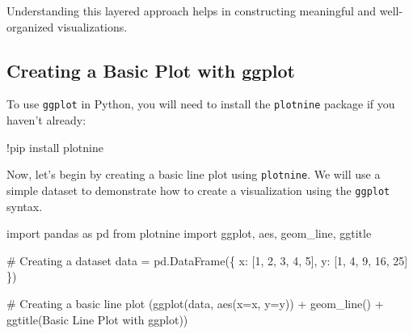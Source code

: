 \documentclass[
  letterpaper,
  DIV=11,
  numbers=noendperiod]{scrreprt}
\newenvironment{Shaded}{\begin{snugshade}}{\end{snugshade}}
\newcommand{\CommentTok}[1]{\textcolor[rgb]{0.37,0.37,0.37}{#1}}
\newcommand{\DecValTok}[1]{\textcolor[rgb]{0.68,0.00,0.00}{#1}}
\newcommand{\ImportTok}[1]{\textcolor[rgb]{0.00,0.46,0.62}{#1}}
\newcommand{\NormalTok}[1]{\textcolor[rgb]{0.00,0.23,0.31}{#1}}
\newcommand{\OperatorTok}[1]{\textcolor[rgb]{0.37,0.37,0.37}{#1}}
\newcommand{\StringTok}[1]{\textcolor[rgb]{0.13,0.47,0.30}{#1}}
\begin{document}
Understanding this layered approach helps in constructing meaningful and
well-organized visualizations.

\hypertarget{creating-a-basic-plot-with-ggplot}{%
\subsection{Creating a Basic Plot with
ggplot}\label{creating-a-basic-plot-with-ggplot}}

To use \texttt{ggplot} in Python, you will need to install the
\texttt{plotnine} package if you haven't already:

\begin{Shaded}
\begin{Highlighting}[]
\OperatorTok{!}\NormalTok{pip install plotnine}
\end{Highlighting}
\end{Shaded}

Now, let's begin by creating a basic line plot using \texttt{plotnine}.
We will use a simple dataset to demonstrate how to create a
visualization using the \texttt{ggplot} syntax.

\begin{Shaded}
\begin{Highlighting}[]
\ImportTok{import}\NormalTok{ pandas }\ImportTok{as}\NormalTok{ pd}
\ImportTok{from}\NormalTok{ plotnine }\ImportTok{import}\NormalTok{ ggplot, aes, geom\_line, ggtitle}

\CommentTok{\# Creating a dataset}
\NormalTok{data }\OperatorTok{=}\NormalTok{ pd.DataFrame(\{}
    \StringTok{\textquotesingle{}x\textquotesingle{}}\NormalTok{: [}\DecValTok{1}\NormalTok{, }\DecValTok{2}\NormalTok{, }\DecValTok{3}\NormalTok{, }\DecValTok{4}\NormalTok{, }\DecValTok{5}\NormalTok{],}
    \StringTok{\textquotesingle{}y\textquotesingle{}}\NormalTok{: [}\DecValTok{1}\NormalTok{, }\DecValTok{4}\NormalTok{, }\DecValTok{9}\NormalTok{, }\DecValTok{16}\NormalTok{, }\DecValTok{25}\NormalTok{]}
\NormalTok{\})}

\CommentTok{\# Creating a basic line plot}
\NormalTok{(ggplot(data, aes(x}\OperatorTok{=}\StringTok{\textquotesingle{}x\textquotesingle{}}\NormalTok{, y}\OperatorTok{=}\StringTok{\textquotesingle{}y\textquotesingle{}}\NormalTok{)) }\OperatorTok{+}
\NormalTok{ geom\_line() }\OperatorTok{+}
\NormalTok{ ggtitle(}\StringTok{\textquotesingle{}Basic Line Plot with ggplot\textquotesingle{}}\NormalTok{))}
\end{Highlighting}
\end{Shaded}
\end{document}
